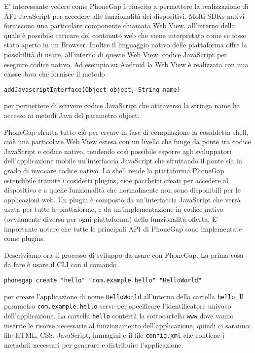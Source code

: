 			E' interessante vedere come PhoneGap è riuscito a permettere la 
			realizzazione di API JavaScript per accedere alle funzionalità 
			dei dispositivi.
			Molti SDKs nativi forniscono una particolare componente chiamata 
			Web View, all'interno della quale è possibile caricare del contenuto 
			web che viene interpretato come se fosse stato aperto in 
			un Browser.
			Inoltre il linguaggio nativo delle piattaforma offre la possibilità 
			di usare, all'interno di queste Web View, codice JavaScript per 
			eseguire codice nativo.
			Ad esempio su Android la Web View è realizzata con una classe Java 
			che fornisce il metodo
	\begin{lstlisting}[language=MyJava]
	addJavascriptInterface(Object object, String name)
	\end{lstlisting}
			per permettere 
			di scrivere codice JavaScript che attraverso la stringa name ha accesso 
			ai metodi Java del parametro object.
						
			PhoneGap sfrutta tutto ciò per creare in fase di compilazione la 
			cosiddetta shell, cioè una particolare 
			Web View estesa con un livello che funge da ponte
			tra codice JavaScript e codice nativo, rendendo così possibile esporre 
			agli sviluppatori dell'applicazione mobile un'interfaccia JavaScript 
			che sfruttando il ponte sia in grado di invocare codice nativo.
			La shell rende la piattaforma PhoneGap estendibile tramite i cosidetti
			plugins, cioè pacchetti creati per accedere al dispositivo e a quelle 
			funzionalità che normalmente non sono disponibili per le applicazioni 
			web. Un plugin è composto da un'interfaccia JavaScript che 
			verrà usata per tutte le piattaforme, e da un'implementazione 
			in codice nativo (ovviamente diversa per ogni piattaforma)
			della funzionalità offerta.
			E' importante notare che tutte le principali API di PhoneGap sono 
			implementate come plugins.
			
			Descriviamo ora il processo di sviluppo da usare con PhoneGap.
			La prima cosa da fare è usare il CLI con il comando 
	\begin{lstlisting}[language=MyBash]
	phonegap create "hello" "com.example.hello" "HelloWorld"
	\end{lstlisting}
			per creare l'applicazione di nome \verb|HelloWorld| all'interno della cartella 
			\verb|hello|. Il parametro \verb|com.example.hello| serve per 
			specificare l'identificatore univoco dell'applicazione.
			La cartella \verb|hello| conterrà la sottocartella \verb|www| dove 
			vanno inserite le risorse necessarie al funzionamento dell'applicazione, 
			quindi ci saranno: file HTML, CSS, JavaScript, immagini e il file 
			\verb|config.xml| che contiene i metadati necessari per generare e 
			distribuire l'applicazione.
			
